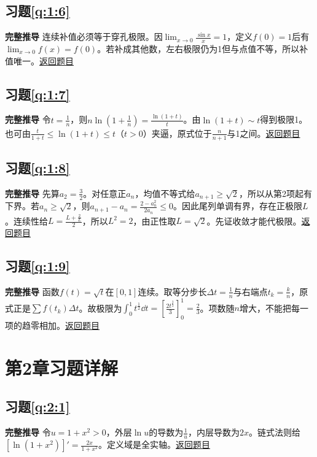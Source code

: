\subsection*{习题\ref{q:1:6}}\label{a:1:6}\textbf{完整推导} 连续补值必须等于穿孔极限。因$\lim_{x\to0}\frac{\sin x}{x}=1$，定义$f(0)=1$后有$\lim_{x\to0}f(x)=f(0)$。若补成其他数，左右极限仍为1但与点值不等，所以补值唯一。\quad\hyperref[q:1:6]{返回题目}

\subsection*{习题\ref{q:1:7}}\label{a:1:7}\textbf{完整推导} 令$t=\frac{1}{n}$，则$n\ln(1+\frac{1}{n})=\frac{\ln(1+t)}{t}$。由$\ln(1+t)\sim t$得到极限1。也可由$\frac{t}{1+t}\le\ln(1+t)\le t$（$t>0$）夹逼，原式位于$\frac{n}{n+1}$与1之间。\quad\hyperref[q:1:7]{返回题目}

\subsection*{习题\ref{q:1:8}}\label{a:1:8}\textbf{完整推导} 先算$a_2=\frac{3}{2}$。对任意正$a_n$，均值不等式给$a_{n+1}\ge\sqrt2$，所以从第2项起有下界。若$a_n\ge\sqrt2$，则$a_{n+1}-a_n=\frac{2-a_n^2}{2a_n}\le0$。因此尾列单调有界，存在正极限$L$。连续性给$L=\frac{L+\frac{2}{L}}{2}$，所以$L^2=2$，由正性取$L=\sqrt2$。先证收敛才能代极限。\quad\hyperref[q:1:8]{返回题目}

\subsection*{习题\ref{q:1:9}}\label{a:1:9}\textbf{完整推导} 函数$f(t)=\sqrt t$在$[0,1]$连续。取等分步长$\Delta t=\frac{1}{n}$与右端点$t_k=\frac{k}{n}$，原式正是$\sum f(t_k)\Delta t$。故极限为$\int_0^1t^{\frac{1}{2}}\dd t=[\frac{2t^{\frac{3}{2}}}{3}]_0^1=\frac{2}{3}$。项数随$n$增大，不能把每一项的趋零相加。\quad\hyperref[q:1:9]{返回题目}

\section{第2章习题详解}

\subsection*{习题\ref{q:2:1}}\label{a:2:1}\textbf{完整推导} 令$u=1+x^2>0$，外层$\ln u$的导数为$\frac{1}{u}$，内层导数为$2x$。链式法则给$[\ln(1+x^2)]'=\frac{2x}{1+x^2}$。定义域是全实轴。\quad\hyperref[q:2:1]{返回题目}

